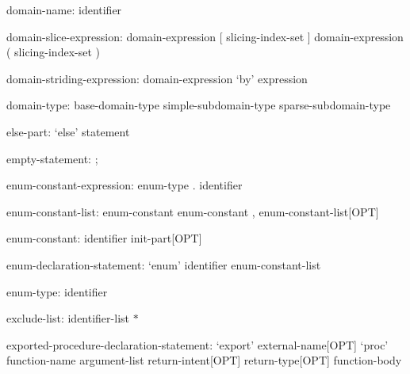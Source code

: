 \begin{syntax}
domain-name:
  identifier
\end{syntax}

\begin{syntax}
domain-slice-expression:
  domain-expression [ slicing-index-set ]
  domain-expression ( slicing-index-set )
\end{syntax}

\begin{syntax}
domain-striding-expression:
  domain-expression `by' expression
\end{syntax}

\begin{syntax}
domain-type:
  base-domain-type
  simple-subdomain-type
  sparse-subdomain-type
\end{syntax}

\begin{syntax}
else-part:
  `else' statement
\end{syntax}

\begin{syntax}
empty-statement:
  ;
\end{syntax}

\begin{syntax}
enum-constant-expression:
  enum-type . identifier
\end{syntax}

\begin{syntax}
enum-constant-list:
  enum-constant
  enum-constant , enum-constant-list[OPT]
\end{syntax}

\begin{syntax}
enum-constant:
  identifier init-part[OPT]
\end{syntax}

\begin{syntax}
enum-declaration-statement:
  `enum' identifier { enum-constant-list }
\end{syntax}

\begin{syntax}
enum-type:
  identifier
\end{syntax}

\begin{syntax}
exclude-list:
  identifier-list
  $ * $
\end{syntax}

\begin{syntax}
exported-procedure-declaration-statement:
  `export' external-name[OPT] `proc' function-name argument-list return-intent[OPT] return-type[OPT]
    function-body
\end{syntax}

